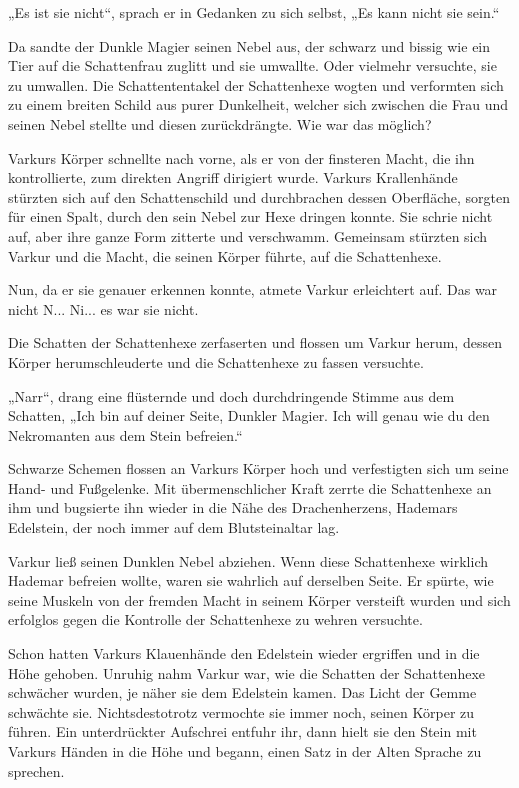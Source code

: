 „Es ist sie nicht“, sprach er in Gedanken zu sich selbst, „Es kann nicht sie sein.“

Da sandte der Dunkle Magier seinen Nebel aus, der schwarz und bissig wie ein Tier auf die Schattenfrau zuglitt und sie umwallte. Oder vielmehr versuchte, sie zu umwallen. Die Schattententakel der Schattenhexe wogten und verformten sich zu einem breiten Schild aus purer Dunkelheit, welcher sich zwischen die Frau und seinen Nebel stellte und diesen zurückdrängte. Wie war das möglich?

Varkurs Körper schnellte nach vorne, als er von der finsteren Macht, die ihn kontrollierte, zum direkten Angriff dirigiert wurde. Varkurs Krallenhände stürzten sich auf den Schattenschild und durchbrachen dessen Oberfläche, sorgten für einen Spalt, durch den sein Nebel zur Hexe dringen konnte. Sie schrie nicht auf, aber ihre ganze Form zitterte und verschwamm. Gemeinsam stürzten sich Varkur und die Macht, die seinen Körper führte, auf die Schattenhexe.

Nun, da er sie genauer erkennen konnte, atmete Varkur erleichtert auf. Das war nicht N... Ni... es war sie nicht.

Die Schatten der Schattenhexe zerfaserten und flossen um Varkur herum, dessen Körper herumschleuderte und die Schattenhexe zu fassen versuchte.

„Narr“, drang eine flüsternde und doch durchdringende Stimme aus dem Schatten, „Ich bin auf deiner Seite, Dunkler Magier. Ich will genau wie du den Nekromanten aus dem Stein befreien.“

Schwarze Schemen flossen an Varkurs Körper hoch und verfestigten sich um seine Hand- und Fußgelenke. Mit übermenschlicher Kraft zerrte die Schattenhexe an ihm und bugsierte ihn wieder in die Nähe des Drachenherzens, Hademars Edelstein, der noch immer auf dem Blutsteinaltar lag.

Varkur ließ seinen Dunklen Nebel abziehen. Wenn diese Schattenhexe wirklich Hademar befreien wollte, waren sie wahrlich auf derselben Seite. Er spürte, wie seine Muskeln von der fremden Macht in seinem Körper versteift wurden und sich erfolglos gegen die Kontrolle der Schattenhexe zu wehren versuchte.

Schon hatten Varkurs Klauenhände den Edelstein wieder ergriffen und in die Höhe gehoben. Unruhig nahm Varkur war, wie die Schatten der Schattenhexe schwächer wurden, je näher sie dem Edelstein kamen. Das Licht der Gemme schwächte sie. Nichtsdestotrotz vermochte sie immer noch, seinen Körper zu führen. Ein unterdrückter Aufschrei entfuhr ihr, dann hielt sie den Stein mit Varkurs Händen in die Höhe und begann, einen Satz in der Alten Sprache zu sprechen.

